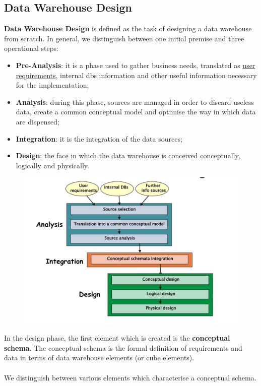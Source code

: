 \documentclass[10pt,a4paper]{article}
\newcommand{\nline}{\\~\\}
\begin{document}
\begin{justify}
\subsection{Data Warehouse Design}
\textbf{Data Warehouse Design} is defined as the task of designing a data warehouse from scratch. In general, we distinguish between one initial premise and three operational steps:
\begin{itemize}
    \item \textbf{Pre-Analysis}: it is a phase used to gather business needs, translated as \uline{user requirements}, internal dbs information and other useful information necessary for the implementation;
    \item \textbf{Analysis}: during this phase, sources are managed in order to discard useless data, create a common conceptual model and optimise the way in which data are dispensed;
    \item \textbf{Integration}: it is the integration of the data sources;
    \item \textbf{Design}: the face in which the data warehouse is conceived conceptually, logically and physically. 
\end{itemize}
\begin{figure}[htp]
\centering
\includegraphics[width=1\textwidth]{images/dwdesign.jpg}\hfill
\end{figure}
In the design phase, the first element which is created is the \textbf{conceptual schema}. The conceptual schema is the formal definition of requirements and data in terms of data warehouse elements (or cube elements). \nline
We distinguish between various elements which characterise a conceptual schema. \\

\end{justify}
\end{document}

